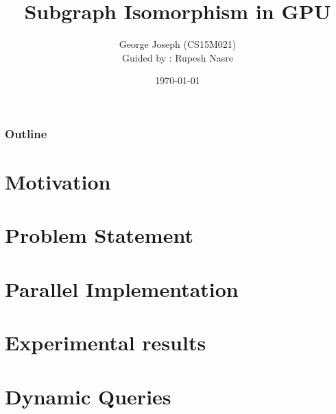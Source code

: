 \documentclass{beamer}
\title[MLC]{Subgraph Isomorphism in GPU \\ } %
\author{{\fontsize{8}{6}\selectfont George Joseph (CS15M021) \\ \vspace{0.1cm}  \vspace{0.1cm} Guided by : Rupesh Nasre} } %
\institute
{
\vspace{0.1cm}
\medskip
{\bf{Department of Computer Science and Engineering}}\\
{\bf{Indian Institute of Technology, Madras}}
}
\date{\color{white}\today} %
\begin{document}
	

	
	
\begin{frame}
\titlepage %

\end{frame}

\begin{frame}
\frametitle{Outline} %
\tableofcontents

\end{frame}
\section{Motivation } 
\section{Problem Statement}
\section{Parallel Implementation}
\section{Experimental results}
\section{Dynamic Queries}
\end{document}
